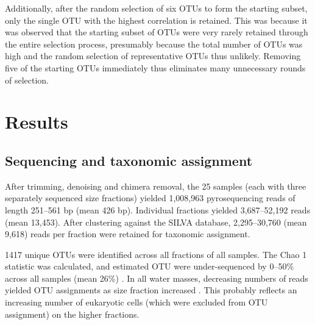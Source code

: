Additionally, after the random selection of six \acp{OTU} to form the starting subset, only the single \ac{OTU} with the highest correlation is retained.
This was because it was observed that the starting subset of \acp{OTU} were very rarely retained through the entire selection process, presumably because the total number of \acp{OTU} was high and the random selection of representative \acp{OTU} thus unlikely.
Removing five of the starting \acp{OTU} immediately thus eliminates many unnecessary rounds of selection.

\section{Results}

\subsection{Sequencing and taxonomic assignment}

After trimming, denoising and chimera removal, the 25 samples (each with three separately sequenced size fractions) yielded 1,008,963 pyrosequencing reads of length 251--561 bp (mean 426 bp).
Individual fractions yielded 3,687--52,192 reads (mean 13,453).
After clustering against the SILVA database, 2,295--30,760 (mean 9,618) reads per fraction were retained for taxonomic assignment.

1417 unique \acp{OTU} were identified across all fractions of all samples.
The Chao 1 statistic was calculated, and estimated \ac{OTU} were under-sequenced by 0--50\% across all samples (mean 26\%) .
In all water masses, decreasing numbers of reads yielded \ac{OTU} assignments as size fraction increased .
This probably reflects an increasing number of eukaryotic cells (which were excluded from \ac{OTU} assignment) on the higher fractions.




